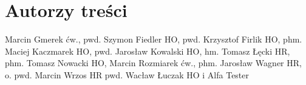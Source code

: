 \chapter{Autorzy treści}

Marcin Gmerek ćw., 
pwd. Szymon Fiedler HO, 
pwd. Krzysztof Firlik HO, 
phm. Maciej Kaczmarek HO, 
pwd. Jarosław Kowalski HO, 
hm. Tomasz Łęcki HR, 
phm. Tomasz Nowacki HO, 
Marcin Rozmiarek ćw., 
phm. Jarosław Wagner HR, 
o. pwd. Marcin Wrzos HR 
pwd. Wacław Łuczak HO
i Alfa Tester